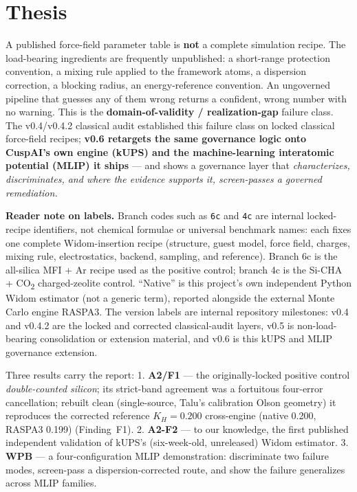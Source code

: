 \section{Thesis}\label{thesis}

A published force-field parameter table is \textbf{not} a complete
simulation recipe. The load-bearing ingredients are frequently
unpublished: a short-range protection convention, a mixing rule applied
to the framework atoms, a dispersion correction, a blocking radius, an
energy-reference convention. An ungoverned pipeline that guesses any of
them wrong returns a confident, wrong number with no warning. This is
the \textbf{domain-of-validity / realization-gap} failure class.
The v0.4/v0.4.2 classical audit established this failure class on locked
classical force-field recipes; \textbf{v0.6 retargets the same governance
logic onto CuspAI's own engine (kUPS) and the machine-learning
interatomic potential (MLIP) it ships} --- and shows a governance
layer that \emph{characterizes, discriminates, and where the evidence
supports it, screen-passes a governed remediation.}

\textbf{Reader note on labels.} Branch codes such as \texttt{6c} and
\texttt{4c} are internal locked-recipe identifiers, not chemical formulae
or universal benchmark names: each fixes one complete Widom-insertion
recipe (structure, guest model, force field, charges, mixing rule,
electrostatics, backend, sampling, and reference). Branch 6c is the
all-silica MFI + Ar recipe used as the positive control; branch 4c is the
Si-CHA + CO\textsubscript{2} charged-zeolite control. ``Native'' is this
project's own independent Python Widom estimator (not a generic term),
reported alongside the external Monte Carlo engine RASPA3. The version
labels are internal repository milestones: v0.4 and v0.4.2 are the locked
and corrected classical-audit layers, v0.5 is non-load-bearing
consolidation or extension material, and v0.6 is this kUPS and MLIP
governance extension.

Three results carry the report: 1. \textbf{A2/F1} --- the originally-locked positive
control \emph{double-counted silicon}; its strict-band agreement was a fortuitous four-error
cancellation; rebuilt clean (single-source, Talu's calibration Olson
geometry) it reproduces the corrected reference \(K_H = 0.200\)
cross-engine (native 0.200, RASPA3 0.199) (Finding~F1). 2. \textbf{A2-F2} --- to our knowledge, the first published
independent validation of kUPS's (six-week-old, unreleased) Widom
estimator. 3. \textbf{WPB} --- a four-configuration MLIP demonstration:
discriminate two failure modes, screen-pass a dispersion-corrected
route, and show the failure generalizes across MLIP families.


